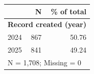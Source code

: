 \begin{tabular}{lrr}


\toprule


 & N & \% of total \\


\midrule


\multicolumn{3}{l}{\textbf{Record created (year)}}\\ 
\midrule
2024        &         867&       50.76\\
2025        &         841&       49.24\\
\midrule


\multicolumn{3}{l}{\footnotesize N =        1,708; Missing =            0}\\


\bottomrule


\end{tabular}



